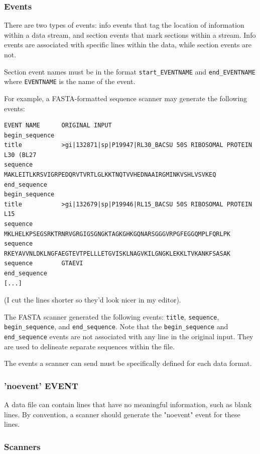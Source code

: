 \documentclass{article}
\begin{document}
\subsubsection{Events}

There are two types of events: info events that tag the location of
information within a data stream, and section events that mark
sections within a stream.  Info events are associated with specific
lines within the data, while section events are not.


Section event names must be in the format \verb|start_EVENTNAME| and
\verb|end_EVENTNAME| where \verb|EVENTNAME| is the name of the event.


For example, a FASTA-formatted sequence scanner may generate the
following events:
\begin{verbatim}
EVENT NAME      ORIGINAL INPUT
begin_sequence  
title           >gi|132871|sp|P19947|RL30_BACSU 50S RIBOSOMAL PROTEIN L30 (BL27
sequence        MAKLEITLKRSVIGRPEDQRVTVRTLGLKKTNQTVVHEDNAAIRGMINKVSHLVSVKEQ
end_sequence
begin_sequence
title           >gi|132679|sp|P19946|RL15_BACSU 50S RIBOSOMAL PROTEIN L15
sequence        MKLHELKPSEGSRKTRNRVGRGIGSGNGKTAGKGHKGQNARSGGGVRPGFEGGQMPLFQRLPK
sequence        RKEYAVVNLDKLNGFAEGTEVTPELLLETGVISKLNAGVKILGNGKLEKKLTVKANKFSASAK
sequence        GTAEVI
end_sequence
[...]
\end{verbatim}

(I cut the lines shorter so they'd look nicer in my editor).


The FASTA scanner generated the following events: \verb|title|, \verb|sequence|,
\verb|begin_sequence|, and \verb|end_sequence|.  Note that the \verb|begin_sequence|
and \verb|end_sequence| events are not associated with any line in the
original input.  They are used to delineate separate sequences within
the file.


The events a scanner can send must be specifically defined for each
data format.


\subsubsection{'noevent' EVENT}

A data file can contain lines that have no meaningful information,
such as blank lines.  By convention, a scanner should generate the
"noevent" event for these lines.




\subsubsection{Scanners}
\end{document}
